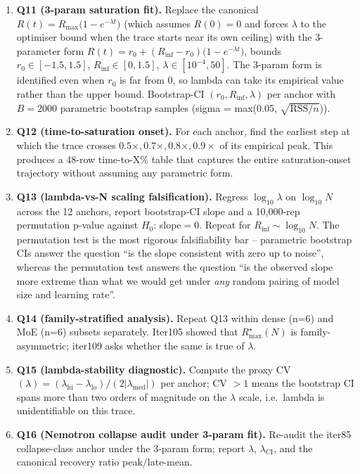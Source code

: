 \begin{enumerate}
\item \textbf{Q11 (3-param saturation fit).}  Replace the canonical
    $R(t) = R_\mathrm{max}\bigl(1 - e^{-\lambda t}\bigr)$ (which assumes
    $R(0)=0$ and forces $\lambda$ to the optimiser bound when the trace
    starts near its own ceiling) with the 3-parameter form
    $R(t) = r_0 + (R_\mathrm{inf} - r_0)\bigl(1 - e^{-\lambda t}\bigr)$,
    bounds $r_0 \in [-1.5, 1.5]$, $R_\mathrm{inf} \in [0, 1.5]$,
    $\lambda \in [10^{-4}, 50]$.  The 3-param form is identified even when
    $r_0$ is far from 0, so lambda can take its empirical value rather
    than the upper bound.  Bootstrap-CI $(r_0, R_\mathrm{inf}, \lambda)$
    per anchor with $B = 2000$ parametric bootstrap samples
    (sigma = max(0.05, $\sqrt{\mathrm{RSS}/n}$)).

\item \textbf{Q12 (time-to-saturation onset).}  For each anchor, find the
    earliest step at which the trace crosses $0.5\times, 0.7\times,
    0.8\times, 0.9\times$ of its empirical peak.  This produces a 48-row
    time-to-X\% table that captures the entire saturation-onset
    trajectory without assuming any parametric form.

\item \textbf{Q13 (lambda-vs-N scaling falsification).}  Regress
    $\log_{10}\lambda$ on $\log_{10} N$ across the 12 anchors, report
    bootstrap-CI slope and a 10{,}000-rep permutation p-value against
    $H_0$: slope$=0$.  Repeat for $R_\mathrm{inf} \sim \log_{10} N$.
    The permutation test is the most rigorous falsifiability bar --
    parametric bootstrap CIs answer the question ``is the slope
    consistent with zero up to noise'', whereas the permutation test
    answers the question ``is the observed slope more extreme than what
    we would get under \emph{any} random pairing of model size and
    learning rate''.

\item \textbf{Q14 (family-stratified analysis).}  Repeat Q13 within
    dense (n=6) and MoE (n=6) subsets separately.  Iter105 showed that
    $R_\mathrm{max}^\star(N)$ is family-asymmetric; iter109 asks whether
    the same is true of $\lambda$.

\item \textbf{Q15 (lambda-stability diagnostic).}  Compute the
    proxy CV$(\lambda) = (\lambda_\mathrm{hi} - \lambda_\mathrm{lo})
    / (2 |\lambda_\mathrm{med}|)$ per anchor; CV $> 1$ means the
    bootstrap CI spans more than two orders of magnitude on the
    $\lambda$ scale, i.e.\ lambda is unidentifiable on this trace.

\item \textbf{Q16 (Nemotron collapse audit under 3-param fit).}
    Re-audit the iter85 collapse-class anchor under the 3-param form;
    report $\lambda$, $\lambda_\mathrm{CI}$, and the canonical
    recovery ratio peak$/$late-mean.
\end{enumerate}

